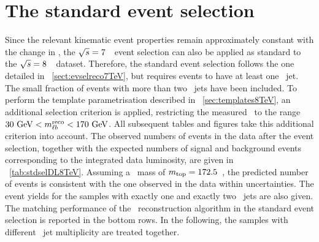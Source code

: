 \section{The standard event selection}
\label{sect:evsel8TeV}
%
Since the relevant kinematic event properties remain approximately constant with the change in \cme, the ${\sqrt{s}}=7$~\TeV\ event selection can also be applied as standard to the ${\sqrt{s}}=8$~\TeV\ dataset.
%
Therefore, the standard event selection follows the one detailed in \sect~\ref{sect:evselreco7TeV}, but requires events to have at least one \btagged\ jet. The small fraction of events with more than two \btagged\ jets have been included.
%
To perform the template parametrisation described in \sect~\ref{sec:templates8TeV}, an additional selection criterion is applied, restricting the measured \mlbr\ to the range  $30~\mathrm{GeV} < m_{\ell b}^{\mathrm{reco}} < 170~\mathrm{GeV}$.  All subsequent tables and figures take this additional criterion into account.
%
The observed numbers of events in the data after the event selection, together with the expected numbers of signal and background events corresponding to the integrated data luminosity, are given in \tab~\ref{tab:stdselDL8TeV}. 
%
Assuming a \tquark\ mass of $m_{\mathrm{top}}=172.5$~\GeV, the predicted number of events is consistent with the one observed in the data within uncertainties. The event yields for the samples with exactly one and exactly two \btagged\ jets are also given. 
%
The matching performance of the \mlb\ reconstruction algorithm in the standard event selection is reported in the bottom rows.
%
In the following, the samples with different \btagged\ jet multiplicity are treated together.
%
